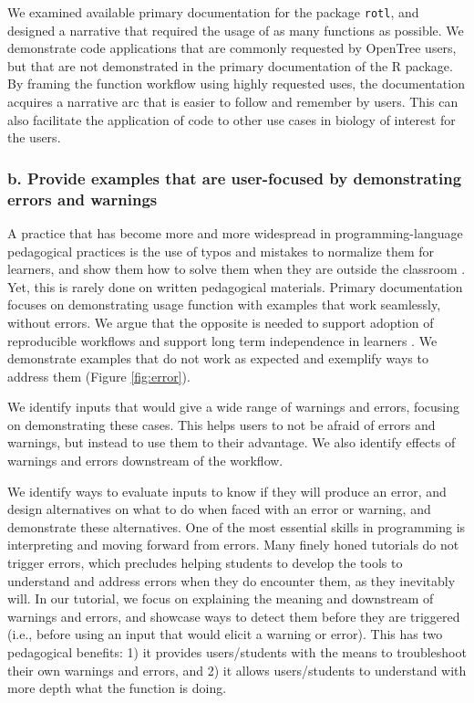 \documentclass[12pt]{article}
\begin{document}
We examined available primary documentation for the package \texttt{rotl},
and designed a narrative that required the usage of as many functions as possible.
We demonstrate code applications that are commonly requested by OpenTree users,
but that are not demonstrated in the primary documentation of the R package.
By framing the function workflow using highly requested uses, the documentation acquires a
narrative arc that is easier to follow and remember by users. This can also facilitate
the application of code to other use cases in biology of interest for the users.


\subsubsection*{b. Provide examples that are user-focused by demonstrating errors and warnings}


A practice that has become more and more widespread in programming-language pedagogical practices
is the use of typos and mistakes to normalize them for learners, and show them how
to solve them when they are outside the classroom \citep{shannon2015live}.
Yet, this is rarely done on written pedagogical materials.
Primary documentation focuses on demonstrating usage function with examples that
work seamlessly, without errors. We argue that the opposite is needed to support
adoption of reproducible workflows and support long term independence in learners
\citep{gaspar2007restoring}.
We demonstrate examples that do not work
as expected and exemplify ways to address them (Figure \ref{fig:error}).

We identify inputs that would give
a wide range of warnings and errors, focusing on demonstrating these cases. This
helps users to not be afraid of errors and warnings, but instead to use them to
their advantage.
We also identify effects of warnings and errors downstream of the workflow.

We identify ways to evaluate inputs to know if they will produce an error, and design
alternatives on what to do when faced with an error or warning, and demonstrate
these alternatives.
One of the most essential skills in programming is interpreting and moving forward
from errors.
Many finely honed tutorials do not trigger errors, which precludes helping students
to develop the tools to understand and address errors when they do encounter them,
as they inevitably will.
In our tutorial, we focus on explaining the meaning and downstream of warnings and errors, and
 showcase ways to detect them before they are triggered (i.e., before using an input
  that would elicit a warning or error). This has two pedagogical benefits:
1) it provides users/students with the means to troubleshoot their own warnings and errors, and
2) it allows users/students to understand with more depth what the function is doing.
\end{document}
